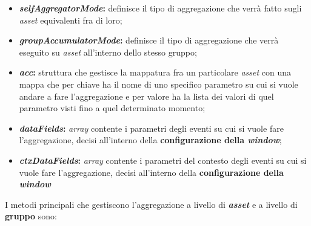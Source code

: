 \begin{itemize}
	\item{\textbf{\textit{selfAggregatorMode}:} definisce il tipo di aggregazione che verrà fatto sugli \textit{asset} equivalenti fra di loro;}
	\item{\textbf{\textit{groupAccumulatorMode}:} definisce il tipo di aggregazione che verrà eseguito su \textit{asset} all'interno dello stesso gruppo;}
	\item{\textbf{\textit{acc}:} struttura che gestisce la mappatura fra un particolare \textit{asset} con una mappa che per chiave ha il nome di uno specifico parametro su cui si vuole andare a fare l'aggregazione e per valore ha la lista dei valori di quel parametro visti fino a quel determinato momento;}
	\item{\textbf{\textit{dataFields}:} \textit{array} contente i parametri degli eventi su cui si vuole fare l'aggregazione, decisi all'interno della \textbf{configurazione della \textit{window}};}
	\item{\textbf{\textit{ctxDataFields}:} \textit{array} contente i parametri del contesto degli eventi su cui si vuole fare l'aggregazione, decisi all'interno della \textbf{configurazione della \textit{window}}}
\end{itemize}

I metodi principali che gestiscono l'aggregazione a livello di \textbf{\textit{asset}} e a livello di \textbf{gruppo} sono:

